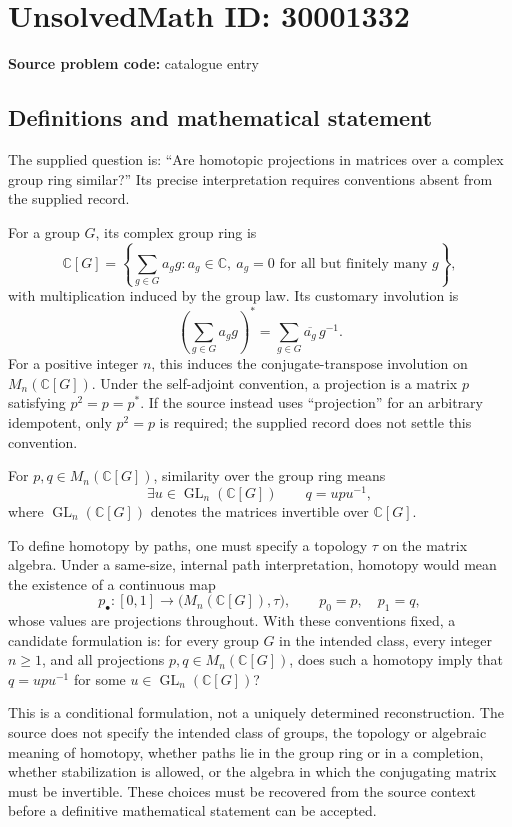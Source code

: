 \documentclass[11pt]{article}
\newcommand{\C}{\mathbb{C}}
\begin{document}
\section*{UnsolvedMath ID: 30001332}
\textbf{Source problem code:} catalogue entry
\subsection{Definitions and mathematical statement}
The supplied question is: ``Are homotopic projections in matrices over a complex group ring similar?'' Its precise interpretation requires conventions absent from the supplied record.

For a group \(G\), its complex group ring is
\[
\C[G]=\left\{\sum_{g\in G}a_g g : a_g\in\C,\ a_g=0\text{ for all but finitely many }g\right\},
\]
with multiplication induced by the group law. Its customary involution is
\[
\left(\sum_{g\in G}a_g g\right)^*=\sum_{g\in G}\overline{a_g}\,g^{-1}.
\]
For a positive integer \(n\), this induces the conjugate-transpose involution on \(M_n(\C[G])\). Under the self-adjoint convention, a projection is a matrix \(p\) satisfying \(p^2=p=p^*\). If the source instead uses ``projection'' for an arbitrary idempotent, only \(p^2=p\) is required; the supplied record does not settle this convention.

For \(p,q\in M_n(\C[G])\), similarity over the group ring means
\[
\exists u\in\operatorname{GL}_n(\C[G])\qquad q=upu^{-1},
\]
where \(\operatorname{GL}_n(\C[G])\) denotes the matrices invertible over \(\C[G]\).

To define homotopy by paths, one must specify a topology \(\tau\) on the matrix algebra. Under a same-size, internal path interpretation, homotopy would mean the existence of a continuous map
\[
p_{\bullet}\colon[0,1]\longrightarrow\bigl(M_n(\C[G]),\tau\bigr),\qquad p_0=p,\quad p_1=q,
\]
whose values are projections throughout. With these conventions fixed, a candidate formulation is: for every group \(G\) in the intended class, every integer \(n\geq1\), and all projections \(p,q\in M_n(\C[G])\), does such a homotopy imply that \(q=upu^{-1}\) for some \(u\in\operatorname{GL}_n(\C[G])\)?

This is a conditional formulation, not a uniquely determined reconstruction. The source does not specify the intended class of groups, the topology or algebraic meaning of homotopy, whether paths lie in the group ring or in a completion, whether stabilization is allowed, or the algebra in which the conjugating matrix must be invertible. These choices must be recovered from the source context before a definitive mathematical statement can be accepted.
\end{document}
